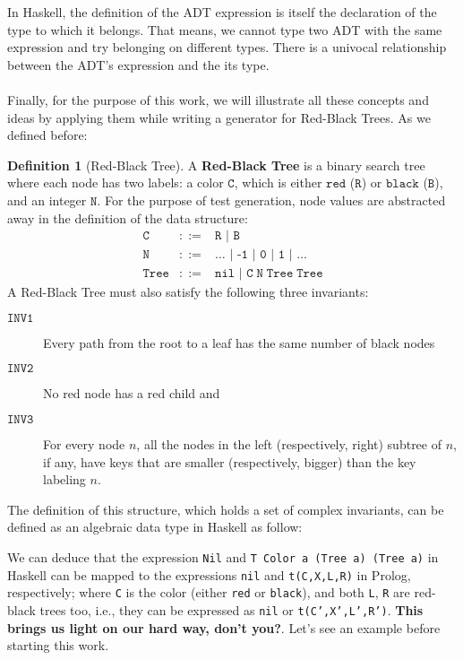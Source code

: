 \documentclass{report}
\theoremstyle{definition}
\theoremstyle{definition}
\newtheorem*{definition*}{Definition}
\begin{document}
In Haskell, the definition of the ADT expression is itself the declaration of the type to which it belongs. That means, we cannot type two ADT with the same expression and try belonging on different types. There is a univocal relationship between the ADT's expression and the its type. \\\\
Finally, for the purpose of this work, we will illustrate all these concepts and ideas by applying them while writing a generator for Red-Black Trees. As we defined before:
\begin{definition*}[Red-Black Tree]
	A \textbf{Red-Black Tree} is a binary search tree where each node has two labels: a color $\mathtt{C}$, which is either $\mathtt{red}$ ($\mathtt{R}$) or $\mathtt{black}$ ($\mathtt{B}$), and an integer $\mathtt{N}$. For the purpose of test generation, node values are abstracted away in the definition of the data structure:
	\begin{equation*}
		\begin{array}{rll}
			\mathtt{C}    & ::= & \mathtt{R} \texttt{ | } \mathtt{B}                        \\
			\mathtt{N}    & ::= & \ldots \texttt{ | -1 | 0 | 1 | } \ldots                   \\
			\mathtt{Tree} & ::= & \mathtt{nil} \texttt{ | } \mathtt{C \; N \; Tree \; Tree} 
		\end{array}
	\end{equation*}
	A Red-Black Tree must also satisfy the following three invariants:
	\begin{description}
		\item[$\mathtt{INV1}$] Every path from the root to a leaf has the same number of black nodes
		\item[$\mathtt{INV2}$] No red node has a red child and
		\item[$\mathtt{INV3}$] For every node $n$, all the nodes in the left (respectively, right) subtree of $n$, if
		any, have keys that are smaller (respectively, bigger) than the key labeling $n$.
	\end{description}
\end{definition*}
The definition of this structure, which holds a set of complex invariants, can be defined as an algebraic data type in Haskell as follow:

We can deduce that the expression \texttt{Nil} and \texttt{T Color a (Tree a) (Tree a)} in Haskell can be mapped to the expressions \texttt{nil} and \texttt{t(C,X,L,R)} in Prolog, respectively; where \texttt{C} is the color (either \texttt{red} or \texttt{black}), and both \texttt{L}, \texttt{R} are red-black trees too, i.e., they can be expressed as \texttt{nil} or \texttt{t(C',X',L',R')}. \textbf{This brings us light on our hard way, don't you?}. Let's see an example before starting this work.
\end{document}
